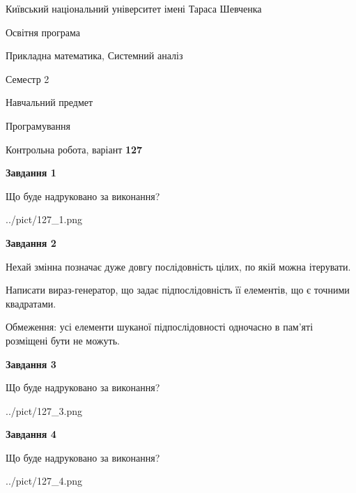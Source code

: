 \documentclass[12pt, ukrainian]{article}
\begin{document}
{{\begin {small}\par
{ \center  Київський національний університет імені Тараса Шевченка \par}
{\parbox {5 cm}{Освітня програма \hfill}{\parbox {8 cm}{Прикладна математика, Системний аналіз \hfill}}\parbox {5 cm}{\hfill Семестр 2}}\par
{\parbox {5 cm} {Навчальний предмет \hfill}\parbox {7 cm}{Програмування \hfill}\parbox {6cm}{\hfill}\par}\vspace{-7pt} \end{small}}{\center Контрольна робота, варіант  \No \textbf
{ 127 }\par}}
{
\begin {large}
{\begin {center}\textbf{Завдання 1}\end {center}}\par
Що буде надруковано за виконання?\par\par
\begin{center}
	{../pict/127_1.png}
\end{center}
\newpage

{\begin {center}\textbf{Завдання 2}\end {center}}\par
Нехай змінна  позначає дуже довгу послідовність цілих, по якій можна ітерувати.

Написати вираз-генератор, що задає підпослідовність її елементів, що є точними квадратами.

Обмеження: усі елементи шуканої підпослідовності одночасно в пам'яті розміщені бути не можуть.\par
\newpage

{\begin {center}\textbf{Завдання 3}\end {center}}\par
Що буде надруковано за виконання?
\begin{center}
	{../pict/127_3.png}
\end{center}
\newpage

{\begin {center}\textbf{Завдання 4}\end {center}}\par
Що буде надруковано за виконання?\par
\begin{center}
	{../pict/127_4.png}
\end{center}
\newpage


\end{large}}
\end{document}
